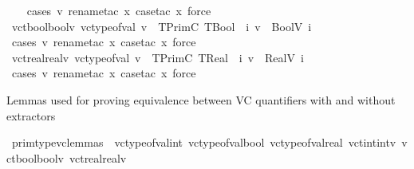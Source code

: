 \begin{isabellebody}
%
\isadelimproof
\ \ %
\endisadelimproof
%
\isatagproof
{}\isamarkupfalse%
\ {\isacharparenleft}{\kern0pt}cases\ v{\isacharcomma}{\kern0pt}\ rename{\isacharunderscore}{\kern0pt}tac\ x{\isacharcomma}{\kern0pt}\ case{\isacharunderscore}{\kern0pt}tac\ x{\isacharsemicolon}{\kern0pt}\ force{\isacharparenright}{\kern0pt}%
\endisatagproof
{\isafoldproof}%
%
\isadelimproof
\isanewline
%
\endisadelimproof
\isanewline
{}\isamarkupfalse%
\ vc{\isacharunderscore}{\kern0pt}tbool{\isacharunderscore}{\kern0pt}boolv{\isacharcolon}{\kern0pt}\ {\isachardoublequoteopen}vc{\isacharunderscore}{\kern0pt}type{\isacharunderscore}{\kern0pt}of{\isacharunderscore}{\kern0pt}val\ v\ {\isacharequal}{\kern0pt}\ TPrimC\ TBool\ {\isasymLongrightarrow}\ {\isasymexists}i{\isachardot}{\kern0pt}\ v\ {\isacharequal}{\kern0pt}\ BoolV\ i{\isachardoublequoteclose}\isanewline
%
\isadelimproof
\ \ %
\endisadelimproof
%
\isatagproof
{}\isamarkupfalse%
\ {\isacharparenleft}{\kern0pt}cases\ v{\isacharcomma}{\kern0pt}\ rename{\isacharunderscore}{\kern0pt}tac\ x{\isacharcomma}{\kern0pt}\ case{\isacharunderscore}{\kern0pt}tac\ x{\isacharsemicolon}{\kern0pt}\ force{\isacharparenright}{\kern0pt}%
\endisatagproof
{\isafoldproof}%
%
\isadelimproof
\isanewline
%
\endisadelimproof
\isanewline
{}\isamarkupfalse%
\ vc{\isacharunderscore}{\kern0pt}treal{\isacharunderscore}{\kern0pt}realv{\isacharcolon}{\kern0pt}\ {\isachardoublequoteopen}vc{\isacharunderscore}{\kern0pt}type{\isacharunderscore}{\kern0pt}of{\isacharunderscore}{\kern0pt}val\ v\ {\isacharequal}{\kern0pt}\ TPrimC\ TReal\ {\isasymLongrightarrow}\ {\isasymexists}i{\isachardot}{\kern0pt}\ v\ {\isacharequal}{\kern0pt}\ RealV\ i{\isachardoublequoteclose}\isanewline
%
\isadelimproof
\ \ %
\endisadelimproof
%
\isatagproof
{}\isamarkupfalse%
\ {\isacharparenleft}{\kern0pt}cases\ v{\isacharcomma}{\kern0pt}\ rename{\isacharunderscore}{\kern0pt}tac\ x{\isacharcomma}{\kern0pt}\ case{\isacharunderscore}{\kern0pt}tac\ x{\isacharsemicolon}{\kern0pt}\ force{\isacharparenright}{\kern0pt}%
\endisatagproof
{\isafoldproof}%
%
\isadelimproof
%
\endisadelimproof
%
\begin{isamarkuptext}%
Lemmas used for proving equivalence between VC quantifiers with and without extractors%
\end{isamarkuptext}\isamarkuptrue%
\isamarkupfalse%
\ prim{\isacharunderscore}{\kern0pt}type{\isacharunderscore}{\kern0pt}vc{\isacharunderscore}{\kern0pt}lemmas\ {\isacharequal}{\kern0pt}\ vc{\isacharunderscore}{\kern0pt}type{\isacharunderscore}{\kern0pt}of{\isacharunderscore}{\kern0pt}val{\isacharunderscore}{\kern0pt}int\ vc{\isacharunderscore}{\kern0pt}type{\isacharunderscore}{\kern0pt}of{\isacharunderscore}{\kern0pt}val{\isacharunderscore}{\kern0pt}bool\ vc{\isacharunderscore}{\kern0pt}type{\isacharunderscore}{\kern0pt}of{\isacharunderscore}{\kern0pt}val{\isacharunderscore}{\kern0pt}real\ vc{\isacharunderscore}{\kern0pt}tint{\isacharunderscore}{\kern0pt}intv\ vc{\isacharunderscore}{\kern0pt}tbool{\isacharunderscore}{\kern0pt}boolv\ vc{\isacharunderscore}{\kern0pt}treal{\isacharunderscore}{\kern0pt}realv\isanewline

\end{isabellebody}
